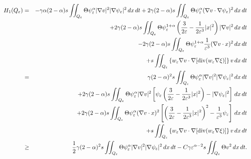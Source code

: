 \documentclass[11pt]{article}
\numberwithin{equation}{section}
\DeclareMathOperator{\Div}{div}
\begin{document}
\begin{eqnarray*}
H_1(Q_\varepsilon)
&=&-\gamma\alpha(2-\alpha)s\iint_{Q_\varepsilon}\Theta \psi_\varepsilon^\alpha |\nabla v|^2|\nabla \psi_\varepsilon|^2\,dx\,dt+2\gamma (2-\alpha)s\iint_{Q_\varepsilon} \Theta \psi_\varepsilon^\alpha (\nabla v\cdot \nabla \psi_\varepsilon)^2\,dx\,dt\\
&&\hspace{4.5mm}+2\gamma (2-\alpha)s\iint_{Q_\varepsilon}\Theta \psi_\varepsilon^{1+\alpha}\left(\frac{3}{2\varepsilon}-\frac{1}{2\varepsilon^3}|x|^2\right)|\nabla v|^2\,dx\,dt\\
&&\hspace{4.5mm}-2\gamma(2-\alpha)s\iint_{Q_\varepsilon}\Theta \psi_\varepsilon^{1+\alpha}\frac{1}{\varepsilon^3}(\nabla v\cdot x)^2\,dx\,dt\\
&&\hspace{4.5mm}+s\iint_{Q_\varepsilon} \left\{w_\varepsilon \nabla v\cdot \nabla [\Div(w_\varepsilon\nabla \xi)]\right\}v\,dx\,dt\\
&=&\gamma(2-\alpha)^2s\iint_{Q_\varepsilon}\Theta\psi_\varepsilon^\alpha|\nabla v|^2|\nabla\psi_\varepsilon|^2\,dx\,dt\\
&&\hspace{4.5mm}+2\gamma (2-\alpha)s\iint_{Q_\varepsilon} \Theta \psi_\varepsilon^{\alpha}|\nabla v|^2\left[\psi_\varepsilon\left(\frac{3}{2\varepsilon}-\frac{1}{2\varepsilon^3}|x|^2\right)-|\nabla\psi_\varepsilon|^2\right]\,dx\,dt\\
&&\hspace{4.5mm}+2\gamma(2-\alpha)s\iint_{Q_\varepsilon}\Theta \psi_\varepsilon^\alpha (\nabla v\cdot x)^2 \left[\left(\frac{3}{2\varepsilon}-\frac{1}{2\varepsilon^3}|x|^2\right)^2-\frac{1}{\varepsilon^3}\psi_\varepsilon\right]\,dx\,dt\\
&&\hspace{4.5mm}+s\iint_{Q_\varepsilon} \left\{w_\varepsilon \nabla v\cdot \nabla [\Div(w_\varepsilon\nabla \xi)]\right\}v\,dx\,dt\\
&\geq& \frac{1}{2}\gamma (2-\alpha)^2s\iint_{Q_\varepsilon}\Theta\psi_\varepsilon^\alpha|\nabla v|^2|\nabla\psi_\varepsilon|^2\,dx\,dt-C\gamma \varepsilon^{\alpha-2}s\iint_{Q_\varepsilon}\Theta v^2\,dx\,dt.
\end{eqnarray*}
\end{document}
